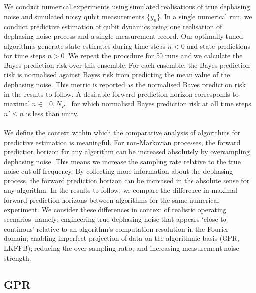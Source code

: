 We conduct numerical experiments using simulated realisations of true dephasing noise and simulated noisy qubit measurements $\{ y_n \}$. In a single numerical run, we conduct predictive estimation of qubit dynamics using one realisation of dephasing noise process and a single measurement record. Our optimally tuned algorithms generate state estimates during time steps $n<0$ and state predictions for time steps $n>0$. We repeat the procedure for 50 runs and we calculate the Bayes prediction risk over this ensemble. For each ensemble, the Bayes prediction risk is normalised against Bayes risk from predicting the mean value of the dephasing noise. This metric is reported as the normalised Bayes prediction risk in the results to follow. A desirable forward prediction horizon corresponds to maximal $n \in [0, N_P]$ for which normalised Bayes prediction risk at all time steps $n' \leq n$ is less than unity.
\\
\\
We define the context within which the comparative analysis of algorithms for predictive estimation is meaningful. For non-Markovian processes, the forward prediction horizon for any algorithm can be increased absolutely by oversampling dephasing noise. This means we increase the sampling rate relative to the true noise cut-off frequency. By collecting more information about the dephasing process, the forward prediction horizon can be increased in the absolute sense for any algorithm. In the results to follow, we compare the difference in maximal forward prediction horizons between algorithms for the same numerical experiment. We consider these differences in context of realistic operating scenarios, namely: engineering true dephasing noise that appears `close to continous' relative to an algorithm's computation resolution in the Fourier domain; enabling imperfect projection of data on the algorithmic basis (GPR, LKFFB); reducing the over-sampling ratio; and increasing measurement noise strength.

\subsection{GPR} 

